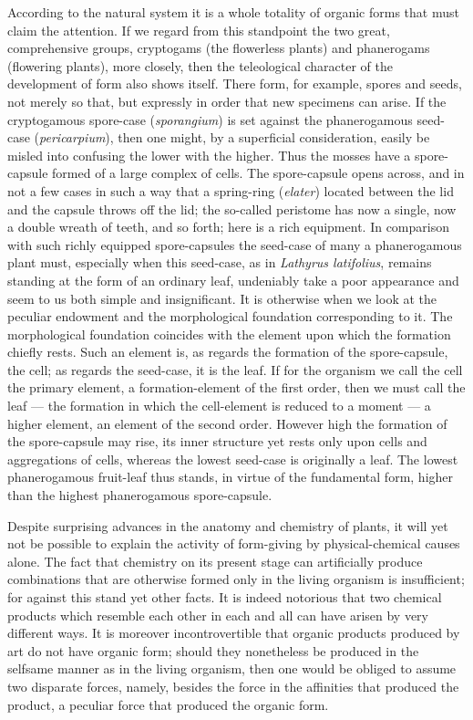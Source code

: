 \documentclass[12pt]{book}
\begin{document}
According to the natural system it is a whole totality of organic forms that must claim
the attention. If we regard from this standpoint the two great, comprehensive groups,
cryptogams (the flowerless plants) and phanerogams (flowering plants), more closely, then
the teleological character of the development of form also shows itself. There form, for
example, spores and seeds, not merely so that, but expressly in order that new specimens
can arise. If the cryptogamous spore-case (\textit{sporangium}) is set against the
phanerogamous seed-case (\textit{pericarpium}), then one might, by a superficial
consideration, easily be misled into confusing the lower with the higher. Thus the mosses
have a spore-capsule formed of a large complex of cells. The spore-capsule opens across,
and in not a few cases in such a way that a spring-ring (\textit{elater}) located between
the lid and the capsule throws off the lid; the so-called peristome has now a single, now
a double wreath of teeth, and so forth; here is a rich equipment. In comparison with such
richly equipped spore-capsules the seed-case of many a phanerogamous plant must,
especially when this seed-case, as in \textit{Lathyrus latifolius}, remains standing at
the form of an ordinary leaf, undeniably take a poor appearance and seem to us both simple
and insignificant. It is otherwise when we look at the peculiar endowment and the
morphological foundation corresponding to it. The morphological foundation coincides with
the element upon which the formation chiefly rests. Such an element is, as regards the
formation of the spore-capsule, the cell; as regards the seed-case, it is the leaf. If for
the organism we call the cell the primary element, a formation-element of the first order,
then we must call the leaf --- the formation in which the cell-element is reduced to a
moment --- a higher element, an element of the second order. However high the formation of
the spore-capsule may rise, its inner structure yet rests only upon cells and aggregations
of cells, whereas the lowest seed-case is originally a leaf. The lowest phanerogamous
fruit-leaf thus stands, in virtue of the fundamental form, higher than the highest
phanerogamous spore-capsule.

Despite surprising advances in the anatomy and chemistry of plants, it will yet not be
possible to explain the activity of form-giving by physical-chemical causes alone. The
fact that chemistry on its present stage can artificially produce combinations that are
otherwise formed only in the living organism is insufficient; for against this stand yet
other facts. It is indeed notorious that two chemical products which resemble each other in
each and all can have arisen by very different ways. It is moreover incontrovertible that
organic products produced by art do not have organic form; should they nonetheless be
produced in the selfsame manner as in the living organism, then one would be obliged to
assume two disparate forces, namely, besides the force in the affinities that produced the
product, a peculiar force that produced the organic form.
\end{document}
